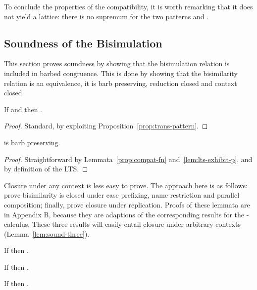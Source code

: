 \documentclass{LMCS}
\begin{document}
To conclude the properties of the compatibility, it is worth remarking that it does not yield a lattice: there is no supremum for the two patterns  and .



\subsection{Soundness of the Bisimulation}
\label{sec:sound}

This section proves soundness by showing that the bisimulation relation is included in barbed congruence.
This is done by showing that the bisimilarity relation is an equivalence, it is
barb preserving, reduction closed and context closed.

\begin{lem}
\label{lem:trans-bisim}
If  and  then .
\end{lem}
\begin{proof}
Standard, by exploiting Proposition~\ref{prop:trans-pattern}.
\end{proof}

\begin{lem}
\label{lem:sound-one}
 is barb preserving.
\end{lem}
\begin{proof}
Straightforward by Lemmata~\ref{prop:compat-fn} and~\ref{lem:lts-exhibit-p}, and by definition of the LTS.
\end{proof}

Closure under any context is less easy to prove.
The approach here is as follows:
prove bisimilarity is closed under case prefixing,
name restriction and parallel composition; finally, prove closure under replication.
Proofs of these lemmata are in Appendix B, because they are adaptions
of the corresponding results for the -calculus.
These three results will easily entail closure under arbitrary contexts (Lemma~\ref{lem:sound-three}).

\begin{lem}
\label{lem:bisim-case}
If  then .
\end{lem}

\begin{lem}
\label{lem:bisim-nu}
If  then .
\end{lem}

\begin{lem}
\label{lem:bisim-par}
If  then .
\end{lem}
\end{document}
